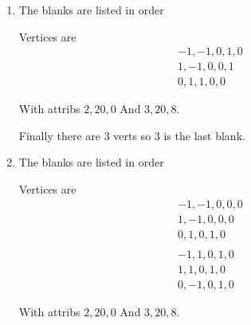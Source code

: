 \documentclass{article}
\begin{document}
\begin{enumerate}
\begin{enumerate}
\begin{mdframed}
                       With attribs $2, 20, 0$
                       And $3, 20, 8$.

                       Finally there are 3 verts so
                       $3$ is the last blank.
                    \end{mdframed}
                \item The blanks are listed in order
                    \begin{mdframed}
                       Vertices are 
                       \begin{gather}
                           -1, -1, 0, 1, 0\\ 
                           1, -1, 0, 0, 1\\
                           0, 1, 1, 0, 0
                       \end{gather}

                       With attribs $2, 20, 0$
                       And $3, 20, 8$.

                       Finally there are 3 verts so
                       $3$ is the last blank.
                    \end{mdframed}
                \item The blanks are listed in order
                    \begin{mdframed}
                       Vertices are 
                       \begin{gather}
                           -1, -1, 0, 0, 0\\ 
                           1, -1, 0, 0, 0\\
                           0, 1, 0, 1, 0\\
                            \\
                           -1, 1, 0, 1, 0\\ 
                           1, 1, 0, 1, 0\\
                           0, -1, 0, 1, 0
                       \end{gather}

                       With attribs $2, 20, 0$
                       And $3, 20, 8$.


\end{mdframed}
\end{enumerate}
\end{enumerate}
\end{document}
